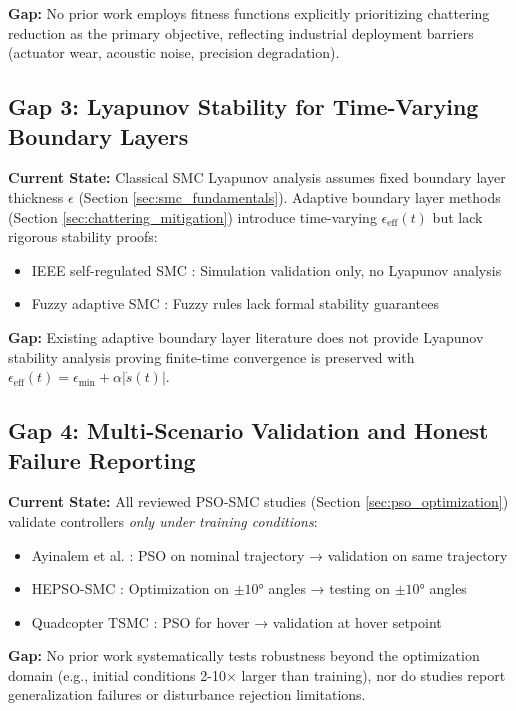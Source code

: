\textbf{Gap:} No prior work employs fitness functions explicitly prioritizing chattering reduction as the primary objective, reflecting industrial deployment barriers (actuator wear, acoustic noise, precision degradation).

\subsection{Gap 3: Lyapunov Stability for Time-Varying Boundary Layers}

\textbf{Current State:} Classical SMC Lyapunov analysis assumes fixed boundary layer thickness $\epsilon$ (Section \ref{sec:smc_fundamentals}). Adaptive boundary layer methods (Section \ref{sec:chattering_mitigation}) introduce time-varying $\epsilon_{\text{eff}}(t)$ but lack rigorous stability proofs:
\begin{itemize}
\item IEEE self-regulated SMC \cite{ieee2018selfreg}: Simulation validation only, no Lyapunov analysis
\item Fuzzy adaptive SMC \cite{frontiers2024fuzzy}: Fuzzy rules lack formal stability guarantees
\end{itemize}

\textbf{Gap:} Existing adaptive boundary layer literature does not provide Lyapunov stability analysis proving finite-time convergence is preserved with $\epsilon_{\text{eff}}(t) = \epsilon_{\min} + \alpha |\dot{s}(t)|$.

\subsection{Gap 4: Multi-Scenario Validation and Honest Failure Reporting}

\textbf{Current State:} All reviewed PSO-SMC studies (Section \ref{sec:pso_optimization}) validate controllers \emph{only under training conditions}:
\begin{itemize}
\item Ayinalem et al. \cite{ayinalem2025pso}: PSO on nominal trajectory → validation on same trajectory
\item HEPSO-SMC \cite{hepso2025manipulator}: Optimization on $\pm 10°$ angles → testing on $\pm 10°$ angles
\item Quadcopter TSMC \cite{mdpi2025quadcopter}: PSO for hover → validation at hover setpoint
\end{itemize}

\textbf{Gap:} No prior work systematically tests robustness beyond the optimization domain (e.g., initial conditions 2-10$\times$ larger than training), nor do studies report generalization failures or disturbance rejection limitations.

